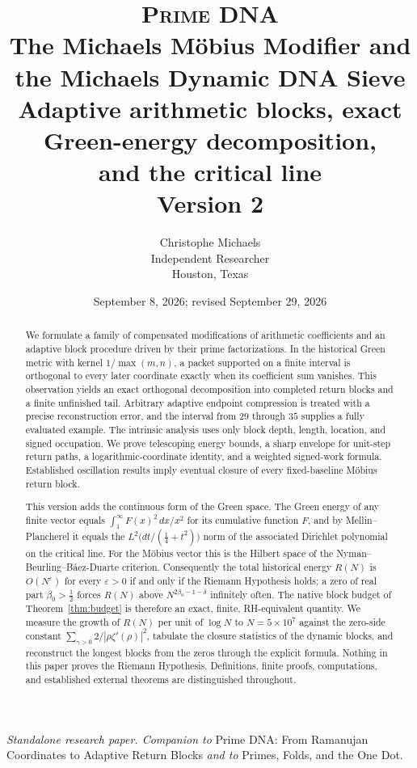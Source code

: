 \documentclass[11pt]{article}
\title{\textsc{Prime DNA}\\[1ex]
\textbf{The Michaels M\"obius Modifier and the Michaels Dynamic DNA Sieve}\\[1ex]
\large Adaptive arithmetic blocks, exact Green-energy decomposition,\\ and the critical line\\[1ex]
\normalsize Version 2}
\author{Christophe Michaels\\ Independent Researcher\\ Houston, Texas}
\date{September 8, 2026; revised September 29, 2026}
\theoremstyle{definition}
\theoremstyle{remark}
\begin{document}
\maketitle

\begin{abstract}
We formulate a family of compensated modifications of arithmetic coefficients and an adaptive block procedure driven by their prime factorizations. In the historical Green metric with kernel $1/\max(m,n)$, a packet supported on a finite interval is orthogonal to every later coordinate exactly when its coefficient sum vanishes. This observation yields an exact orthogonal decomposition into completed return blocks and a finite unfinished tail. Arbitrary adaptive endpoint compression is treated with a precise reconstruction error, and the interval from $29$ through $35$ supplies a fully evaluated example. The intrinsic analysis uses only block depth, length, location, and signed occupation. We prove telescoping energy bounds, a sharp envelope for unit-step return paths, a logarithmic-coordinate identity, and a weighted signed-work formula. Established oscillation results imply eventual closure of every fixed-baseline M\"obius return block.

This version adds the continuous form of the Green space. The Green energy of any finite vector equals $\int_1^\infty F(x)^2\,dx/x^2$ for its cumulative function $F$, and by Mellin--Plancherel it equals the $L^2\big(dt/(\tfrac14+t^2)\big)$ norm of the associated Dirichlet polynomial on the critical line. For the M\"obius vector this is the Hilbert space of the Nyman--Beurling--B\'aez-Duarte criterion. Consequently the total historical energy $R(N)$ is $O(N^{\varepsilon})$ for every $\varepsilon>0$ if and only if the Riemann Hypothesis holds; a zero of real part $\beta_0>\tfrac12$ forces $R(N)$ above $N^{2\beta_0-1-\delta}$ infinitely often. The native block budget of Theorem~\ref{thm:budget} is therefore an exact, finite, RH-equivalent quantity. We measure the growth of $R(N)$ per unit of $\log N$ to $N=5\times10^7$ against the zero-side constant $\sum_{\gamma>0}2/|\rho\zeta'(\rho)|^2$, tabulate the closure statistics of the dynamic blocks, and reconstruct the longest blocks from the zeros through the explicit formula. Nothing in this paper proves the Riemann Hypothesis. Definitions, finite proofs, computations, and established external theorems are distinguished throughout.
\end{abstract}

\noindent\emph{Standalone research paper. Companion to} Prime DNA: From Ramanujan Coordinates to Adaptive Return Blocks \emph{and to} Primes, Folds, and the One Dot.
\end{document}
